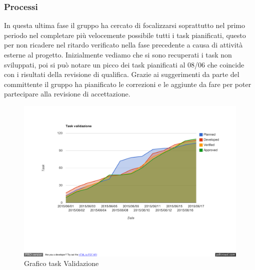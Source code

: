 		\subsubsection{Processi}
			In questa ultima fase il gruppo ha cercato di focalizzarsi soprattutto nel primo periodo nel completare più velocemente possibile tutti i task pianificati, questo per non ricadere nel ritardo verificato nella fase precedente a causa di attività esterne al progetto. Inizialmente vediamo che si sono recuperati i task non sviluppati, poi si può notare un picco dei task pianificati al 08/06 che coincide con  i risultati della revisione di qualifica. Grazie ai suggerimenti da parte del committente il gruppo ha pianificato le correzioni e le aggiunte da fare per poter partecipare alla revisione di accettazione.
			\begin{figure}[htbp]
				\centering
				\centerline{\includegraphics[scale=0.7]{images/Grafico_fase_8.pdf}}
				\caption{Grafico task Validazione}
				\label{fig:taskfase8}
			\end{figure}
			
